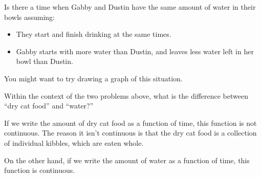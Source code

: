 \documentclass{ximera}
\begin{document}
\begin{problem}
  Is there a time when Gabby and Dustin have the same amount of water in
  their bowls assuming:
  \begin{itemize}
  \item They start and finish drinking at the same times.
  \item Gabby starts with more water than Dustin, and leaves less water
    left in her bowl than Dustin.
  \end{itemize}
    \begin{hint}
  	You might want to try drawing a graph of this situation.
  \end{hint}
    \begin{multipleChoice}
  \end{multipleChoice}
\end{problem}



\begin{problem}
  Within the context of the two problems above, what is the difference
  between ``dry cat food'' and ``water?''
  \begin{freeResponse}
    If we write the amount of dry cat food as a function of time, this function
    is not continuous.  The reason it isn't continuous is that the dry cat food
    is a collection of individual kibbles, which are eaten whole.
    
    On the other hand, if we write the amount of water as a function of time, 
    this function is continuous.
  \end{freeResponse}
\end{problem}

%
\end{document}
